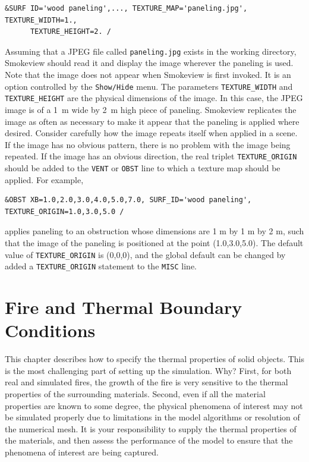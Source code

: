 \documentclass[11pt]{book}
\newcommand{\ct}{\tt\small}
\begin{document}
\footnotesize
\begin{verbatim}
&SURF ID='wood paneling',..., TEXTURE_MAP='paneling.jpg', TEXTURE_WIDTH=1.,
      TEXTURE_HEIGHT=2. /
\end{verbatim}
\normalsize
Assuming that a JPEG file called {\ct paneling.jpg} exists in the
working directory, Smokeview should read it and display the image
wherever the paneling is used.
Note that the image does not appear when Smokeview is first invoked. It is an option controlled by
the {\ct Show/Hide} menu. The parameters {\ct TEXTURE\_WIDTH}
and {\ct TEXTURE\_HEIGHT} are the physical dimensions of the image. In this case,
the JPEG image is of a 1~m wide by 2~m high piece of
paneling. Smokeview replicates the image as often as necessary to
make it appear that the paneling is applied where desired.
Consider carefully how the image repeats itself when
applied in a scene. If the image has no obvious pattern, there is no
problem with the image being repeated. If the image has an obvious
direction, the real triplet {\ct TEXTURE\_ORIGIN} should be added to
the {\ct VENT} or {\ct OBST} line to which a texture map
should be applied. For example,

\footnotesize
\begin{verbatim}
&OBST XB=1.0,2.0,3.0,4.0,5.0,7.0, SURF_ID='wood paneling', TEXTURE_ORIGIN=1.0,3.0,5.0 /
\end{verbatim}
\normalsize
applies paneling to an obstruction whose dimensions are 1 m by
1 m by 2 m, such that the image of the paneling is positioned
at the point (1.0,3.0,5.0). The default value of {\ct TEXTURE\_ORIGIN}
is (0,0,0), and the global default can be changed by added a
{\ct TEXTURE\_ORIGIN} statement to the {\ct MISC} line.






\chapter{Fire and Thermal Boundary Conditions}

This chapter describes how to specify the thermal properties of solid objects. This is
the most challenging part of setting up the simulation. Why?  First,
for both real and simulated fires, the growth of the fire is very
sensitive to the thermal properties of the surrounding
materials. Second, even if all the material properties are known to
some degree, the physical phenomena of interest may not be simulated
properly due to limitations in the model algorithms or resolution of
the numerical mesh. It is your responsibility to supply the thermal
properties of the materials, and then assess the performance of the
model to ensure that the phenomena of interest are being captured.
\end{document}

